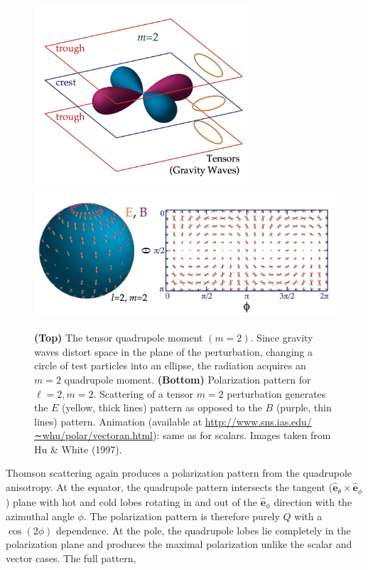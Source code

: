 \documentclass[a4paper,11pt]{article}
\begin{document}
\begin{figure}[t!]
    \centering
    \includegraphics[width=8cm]{figures/TensorQuadrupole.png}
    \includegraphics[width=15cm]{figures/TensorPattern.png}
    \caption{\footnotesize{\textbf{(Top)} The tensor quadrupole moment $(m=2)$. Since gravity waves distort space in the plane of the perturbation, changing a circle of test particles into an ellipse, the radiation acquires an $m=2$ quadrupole moment. \textbf{(Bottom)} Polarization pattern for $\ell=2,m=2$. Scattering of a tensor $m=2$ perturbation generates the $E$ (yellow, thick lines) pattern as opposed to the $B$ (purple, thin lines) pattern. Animation (available at \href{http://www.sns.ias.edu/∼whu/polar/vectoran.html}{http://www.sns.ias.edu/∼whu/polar/vectoran.html}): same as for scalars. Images taken from Hu \& White (1997).}}
    \label{fig:tensor}
\end{figure}

{\noindent}Thomson scattering again produces a polarization pattern from the quadrupole anisotropy. At the equator, the quadrupole pattern intersects the tangent ($\bm{\hat{e}}_\theta\times\bm{\hat{e}}_\phi$) plane with hot and cold lobes rotating in and out of the $\bm{\hat{e}}_\phi$ direction with the azimuthal angle $\phi$. The polarization pattern is therefore purely $Q$ with a $\cos(2\phi)$ dependence. At the pole, the quadrupole lobes lie completely in the polarization plane and produces the maximal polarization unlike the scalar and vector cases. The full pattern,
\end{document}
